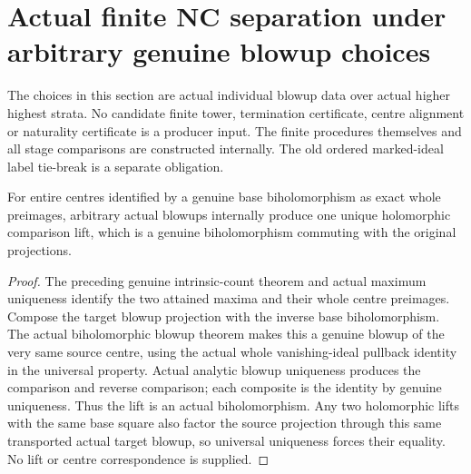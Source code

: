 \section{Actual finite NC separation under arbitrary genuine blowup choices}
\label{sec:hironaka-normal-crossings-separation-choice-comparison}

The choices in this section are actual individual blowup data over actual
higher highest strata. No candidate finite tower, termination certificate,
centre alignment or naturality certificate is a producer input. The
finite procedures themselves and all stage comparisons are constructed
internally. The old ordered marked-ideal label tie-break is a separate
obligation.

\begin{lemma}
\label{hir:general-nc-actual-highest-step-unique-lift}
\leanok
For entire centres identified by a genuine base biholomorphism as exact
whole preimages, arbitrary actual blowups internally produce one unique
holomorphic comparison lift,
which is a genuine biholomorphism commuting with the original projections.
\end{lemma}
\begin{proof}
The preceding genuine intrinsic-count theorem and actual maximum
uniqueness identify the two attained maxima and their whole centre
preimages. Compose the target blowup projection with the inverse
base biholomorphism. The actual biholomorphic blowup theorem makes
this a genuine blowup of the very same source centre, using the actual
whole vanishing-ideal pullback identity in the universal property.
Actual analytic blowup uniqueness produces the comparison and reverse
comparison; each composite is the identity by genuine uniqueness.
Thus the lift is an actual biholomorphism. Any two holomorphic lifts
with the same base square also factor the source projection through
this same transported actual target blowup, so universal uniqueness
forces their equality. No lift or centre correspondence is supplied.
\end{proof}

